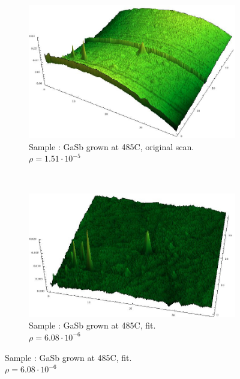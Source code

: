 \begin{figure}
    \begin{subfigure}{0.4\columnwidth}
         \includegraphics[width=\textwidth]{Bilder/s2_gasb_485c_orig.jpg}
         \caption{Sample : GaSb grown at 485\textdegree C, original 
         scan.  $\rho = 1.51 \cdot 10^{-5}$}
        \label{s2_orig}
    \end{subfigure}
    ~
    \begin{subfigure}{0.4\columnwidth}
         \includegraphics[width=\textwidth]{Bilder/s2_gasb_485c_f.jpg}
         \caption{Sample : GaSb grown at 485\textdegree C, fit. \\
         $\rho = 6.08 \cdot 10^{-6}$}
        \label{s2_flat}
    \end{subfigure}
     

\end{figure}
